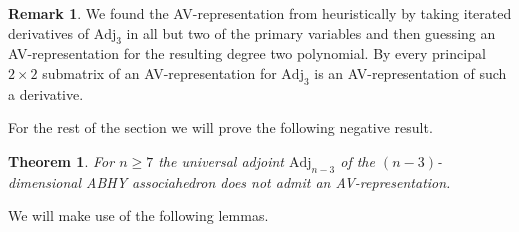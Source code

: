 \documentclass[a4paper,10pt]{amsart}
\theoremstyle{definition}
\newtheorem{rem}[Def]{Remark}
\theoremstyle{plain}
\newtheorem{thm}[Def]{Theorem}
\begin{document}
\begin{rem}
    We found the AV-representation from  heuristically by taking iterated derivatives of $\mathrm{Adj}_3$ in all but two of the primary variables and then guessing an AV-representation for the resulting degree two polynomial. By  every principal $2\times2$ submatrix of an AV-representation for $\mathrm{Adj}_3$ is an AV-representation of such a derivative.
\end{rem}

For the rest of the section we will prove the following negative result.

\begin{thm}\label{thm:noavrep}
    For $n\geq 7$ the universal adjoint $\mathrm{Adj}_{n-3}$ of the $(n-3)$-dimensional ABHY associahedron does not admit an AV-representation.
\end{thm}

We will make use of the following lemmas.
\end{document}
